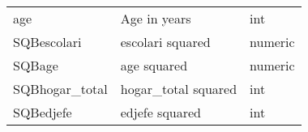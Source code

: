 \documentclass[11pt]{article}
\begin{document}
\begin{longtable}[]{@{}lll@{}}
\begin{minipage}[t]{0.19\columnwidth}\raggedright\strut
age\strut
\end{minipage} & \begin{minipage}[t]{0.16\columnwidth}\raggedright\strut
Age in years\strut
\end{minipage} & \begin{minipage}[t]{0.24\columnwidth}\raggedright\strut
int\strut
\end{minipage}\tabularnewline
\begin{minipage}[t]{0.19\columnwidth}\raggedright\strut
SQBescolari\strut
\end{minipage} & \begin{minipage}[t]{0.16\columnwidth}\raggedright\strut
escolari squared\strut
\end{minipage} & \begin{minipage}[t]{0.24\columnwidth}\raggedright\strut
numeric\strut
\end{minipage}\tabularnewline
\begin{minipage}[t]{0.19\columnwidth}\raggedright\strut
SQBage\strut
\end{minipage} & \begin{minipage}[t]{0.16\columnwidth}\raggedright\strut
age squared\strut
\end{minipage} & \begin{minipage}[t]{0.24\columnwidth}\raggedright\strut
numeric\strut
\end{minipage}\tabularnewline
\begin{minipage}[t]{0.19\columnwidth}\raggedright\strut
SQBhogar\_total\strut
\end{minipage} & \begin{minipage}[t]{0.16\columnwidth}\raggedright\strut
hogar\_total squared\strut
\end{minipage} & \begin{minipage}[t]{0.24\columnwidth}\raggedright\strut
int\strut
\end{minipage}\tabularnewline
\begin{minipage}[t]{0.19\columnwidth}\raggedright\strut
SQBedjefe\strut
\end{minipage} & \begin{minipage}[t]{0.16\columnwidth}\raggedright\strut
edjefe squared\strut
\end{minipage} & \begin{minipage}[t]{0.24\columnwidth}\raggedright\strut
int\strut
\end{minipage}\tabularnewline

\end{longtable}
\end{document}
